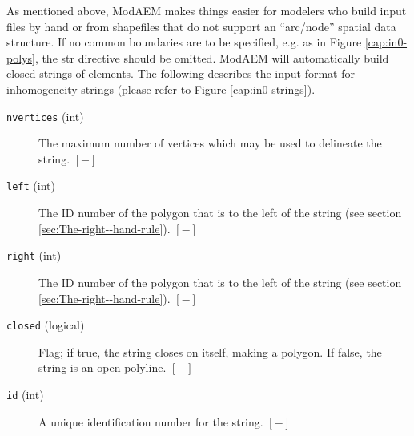 As mentioned above, ModAEM makes things easier for modelers who build input files by hand or from shapefiles that do not support an ``arc/node'' spatial data structure. If no common boundaries are to be specified, e.g. as in Figure \ref{cap:in0-polys}, the \textsf{str} directive should be omitted. ModAEM will automatically build closed strings of elements. The following describes the input format for inhomogeneity strings (please refer to Figure \ref{cap:in0-strings}).
\begin{description}
\item [{\texttt{nvertices}} (int)] The maximum number of vertices which may be used to delineate the string. $[-]$
\item [{\texttt{left}} (int)] The ID number of the polygon that is to the left of the string (see section \ref{sec:The-right--hand-rule}). $[-]$
\item [{\texttt{right}} (int)] The ID number of the polygon that is to the left of the string (see section \ref{sec:The-right--hand-rule}). $[-]$
\item [{\texttt{closed}} (logical)] Flag; if true, the string closes on itself, making a polygon. If false, the string is an open polyline. $[-]$
\item [{\texttt{id}} (int)] A unique identification number for the string. $[-]$
\end{description}